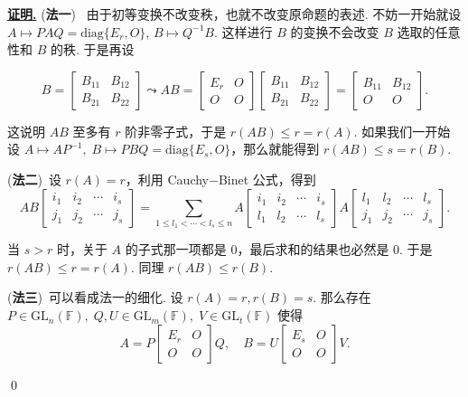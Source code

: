 \documentclass[10pt,openany]{article}
\theoremstyle{thmstyle} %
\theoremstyle{defstyle} %
\theoremstyle{prostyle} %
\theoremstyle{exastyle}
\theoremstyle{remstyle}
\renewenvironment{proof}[1][证明]{\par\underline{\textbf{#1.}} \;\fangsong}{\qed\par}
\newcommand{\F}{\mathbb{F}}
\newcommand{\gfn}{\text{GL}_n(\mathbb{F})}
\newcommand{\gfm}{\text{GL}_m(\mathbb{F})}
\newcommand{\diag}{\mathrm{diag}}
\begin{document}
\begin{proof}
	(\textbf{法一}) \ 由于初等变换不改变秩，也就不改变原命题的表述. 不妨一开始就设 \( A \mapsto PAQ= \diag\{E_r,O\} \), \( B \mapsto Q^{-1}B \). 这样进行 \( B \) 的变换不会改变 \( B \) 选取的任意性和 \( B \) 的秩. 于是再设
	
	\[
	B =\begin{bmatrix}
		B_{11} & B_{12} \\
		B_{21} & B_{22}
	\end{bmatrix} \leadsto AB =\begin{bmatrix}
		E_r & O \\
		O   & O
	\end{bmatrix}\begin{bmatrix}
		B_{11} & B_{12} \\
		B_{21} & B_{22}
	\end{bmatrix}=\begin{bmatrix}
		B_{11} & B_{12} \\
		O      & O
	\end{bmatrix}.
	\]
	
	这说明 \( AB \) 至多有 \( r \) 阶非零子式，于是 \( r(AB) \leq r=r(A) \). 如果我们一开始设 \( A \mapsto AP^{-1}, \; B \mapsto PBQ=\diag\{E_s,O\} \)，那么就能得到 \( r(AB) \leq s=r(B) \).
	
	\vspace{1ex}
	
	(\textbf{法二})\ 设 \( r(A)=r \)，利用 Cauchy\(-\)Binet 公式，得到
	\[ AB\begin{bmatrix}
		i_1 & i_2 & \cdots & i_s \\
		j_1 & j_2 & \cdots & j_s
	\end{bmatrix}= \sum_{1 \leq l_1 < \cdots < l_s \leq n}^{} A\begin{bmatrix}
	i_1 & i_2 & \cdots & i_s \\
	l_1 & l_2 & \cdots & l_s
	\end{bmatrix} A\begin{bmatrix}
	l_1 & l_2 & \cdots & l_s\\
	j_1 & j_2 & \cdots & j_s
	\end{bmatrix}. \]
	
	当 \( s>r \) 时，关于 \( A \) 的子式那一项都是 0，最后求和的结果也必然是 0. 于是 \( r(AB) \leq r=r(A) \). 同理 \( r(AB) \leq r(B) \). 
	
	\vspace{1ex}
	
	(\textbf{法三})\ 可以看成法一的细化. 设 \( r(A)=r, r(B)=s \). 那么存在 \( P \in \gfn, \; Q, U \in \gfm, \; V \in \text{GL}_t(\F) \) 使得
	\[
	A = P
	\begin{bmatrix}
		E_r & O \\
		O   & O
	\end{bmatrix}
	Q, 
	\quad 
	B = U
	\begin{bmatrix}
		E_s & O \\
		O   & O
	\end{bmatrix}
	V.
	\]
	

\end{proof}
\end{document}
